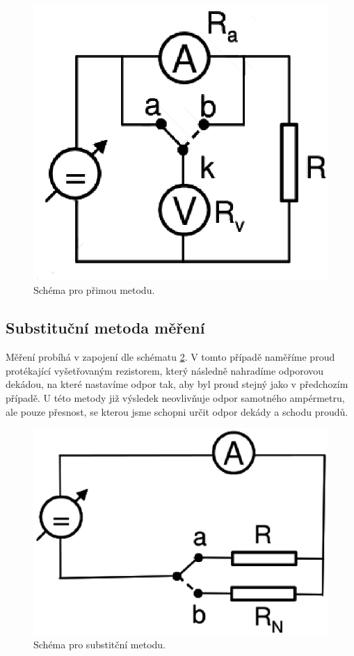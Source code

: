 \documentclass[a4paper,12pt]{article}
\begin{document}
\begin{figure}
\begin{center}
\includegraphics[scale=0.8]{sch1.eps}
\caption{Schéma pro přimou metodu.}
\end{center}
\label{sch1}
\end{figure}

\subsection{Substituční metoda měření}
Měření probíhá v zapojení dle schématu \ref{sch2}. V tomto případě naměříme proud protékající vyšetřovaným rezistorem, který následně nahradíme odporovou dekádou, 
na které nastavíme odpor tak, aby byl proud stejný jako v předchozím případě. U této metody již výsledek neovlivňuje odpor samotného ampérmetru, ale pouze 
přesnost, se kterou jsme schopni určit odpor dekády a schodu proudů.

\begin{figure}
\begin{center}
\includegraphics[scale=0.8]{sch2.eps}
\caption{Schéma pro substitční metodu.}
\label{sch2}
\end{center}
\end{figure}
\end{document}
